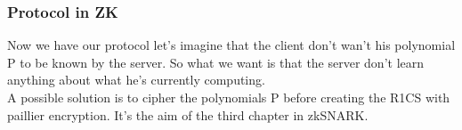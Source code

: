 \subsubsection{Protocol in ZK}
Now we have our protocol let's imagine that the client don't wan't his polynomial P to be known by the server. So what we want is that the server don't learn anything about what he's currently computing.
\\ A possible solution is to cipher the polynomials P before creating the R1CS with paillier encryption. It's the aim of the third chapter in zkSNARK.